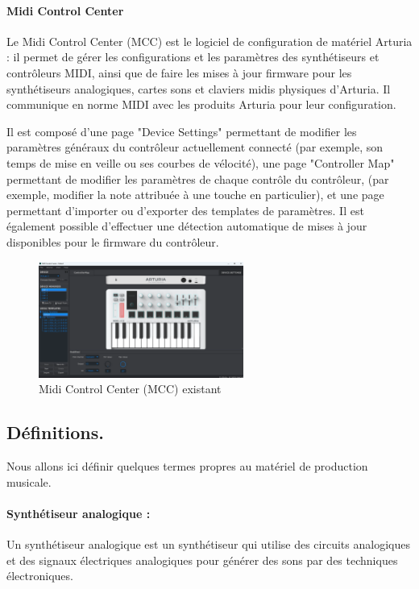 \documentclass[francais]{rapportPFE}  %
\begin{document}
\paragraph{Midi Control Center}
Le Midi Control Center (MCC) est le logiciel de configuration de matériel Arturia : il
permet de gérer les configurations et les paramètres des synthétiseurs et contrôleurs MIDI, ainsi que de faire les mises à jour firmware pour les synthétiseurs analogiques, cartes sons et claviers midis physiques d’Arturia. Il communique en norme MIDI avec les produits Arturia pour leur configuration.

Il est composé d'une page "Device Settings" permettant de modifier les paramètres généraux du contrôleur actuellement connecté (par exemple, son temps de mise en veille ou ses courbes de vélocité), une page "Controller Map" permettant de modifier les paramètres de chaque contrôle du contrôleur, (par exemple, modifier la note attribuée à une touche en particulier), et une page permettant d'importer ou d'exporter des templates de paramètres. Il est également possible d'effectuer une détection automatique de mises à jour disponibles pour le firmware du contrôleur.

\begin{figure}[!t]
	\centering
	\includegraphics[width=0.6\textwidth]{graphics/mcc_existant.png}
	\begin{tiny}
	\end{tiny}
	\caption{Midi Control Center (MCC) existant}
	\label{fig:Expe}
\end{figure}


\subsection{Définitions.}
Nous allons ici définir quelques termes propres au matériel de production musicale.
\paragraph{Synthétiseur analogique :} Un synthétiseur analogique est un synthétiseur qui utilise des circuits analogiques et des signaux électriques analogiques pour générer des sons par des techniques électroniques.
\end{document}
